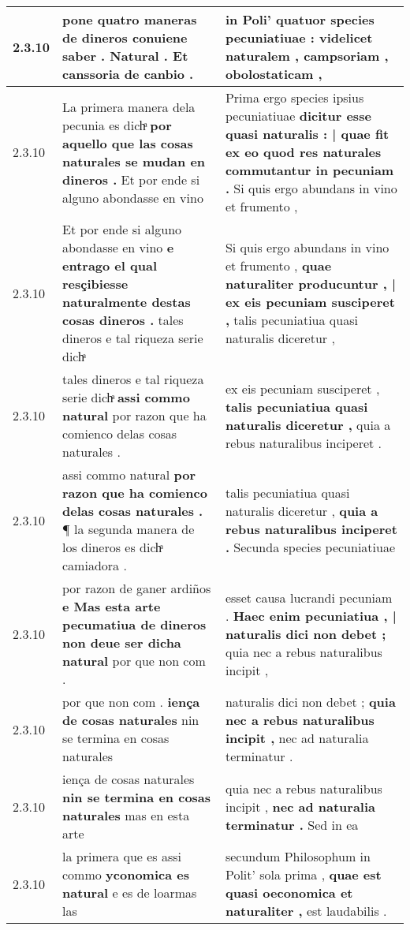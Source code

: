 \begin{tabular}{|p{1cm}|p{6.5cm}|p{6.5cm}|}
2.3.10 & pone quatro maneras de dineros conuiene saber . \textbf{ Natural . } Et canssoria de canbio . & in Poli’ \textbf{ quatuor species pecuniatiuae : } videlicet naturalem , campsoriam , obolostaticam , \\\hline
2.3.10 & La primera manera dela pecunia es dichͣ \textbf{ por aquello que las cosas naturales se mudan en dineros . } Et por ende si alguno abondasse en vino & Prima ergo species ipsius pecuniatiuae \textbf{ dicitur esse quasi naturalis : | quae fit ex eo quod res naturales commutantur in pecuniam . } Si quis ergo abundans in vino et frumento , \\\hline
2.3.10 & Et por ende si alguno abondasse en vino \textbf{ e entrago el qual resçibiesse naturalmente destas cosas dineros . } tales dineros e tal riqueza serie dichͣ & Si quis ergo abundans in vino et frumento , \textbf{ quae naturaliter producuntur , | ex eis pecuniam susciperet , } talis pecuniatiua quasi naturalis diceretur , \\\hline
2.3.10 & tales dineros e tal riqueza serie dichͣ \textbf{ assi commo natural } por razon que ha comienco delas cosas naturales . & ex eis pecuniam susciperet , \textbf{ talis pecuniatiua quasi naturalis diceretur , } quia a rebus naturalibus inciperet . \\\hline
2.3.10 & assi commo natural \textbf{ por razon que ha comienco delas cosas naturales . } ¶ la segunda manera de los dineros es dichͣ camiadora . & talis pecuniatiua quasi naturalis diceretur , \textbf{ quia a rebus naturalibus inciperet . } Secunda species pecuniatiuae \\\hline
2.3.10 & por razon de ganer ardiños \textbf{ e Mas esta arte pecumatiua de dineros non deue ser dicha natural } por que non com . & esset causa lucrandi pecuniam . \textbf{ Haec enim pecuniatiua , | naturalis dici non debet ; } quia nec a rebus naturalibus incipit , \\\hline
2.3.10 & por que non com . \textbf{ iença de cosas naturales } nin se termina en cosas naturales & naturalis dici non debet ; \textbf{ quia nec a rebus naturalibus incipit , } nec ad naturalia terminatur . \\\hline
2.3.10 & iença de cosas naturales \textbf{ nin se termina en cosas naturales } mas en esta arte & quia nec a rebus naturalibus incipit , \textbf{ nec ad naturalia terminatur . } Sed in ea \\\hline
2.3.10 & la primera que es assi commo \textbf{ yconomica es natural } e es de loarmas las & secundum Philosophum in Polit’ sola prima , \textbf{ quae est quasi oeconomica et naturaliter , } est laudabilis . \\\hline

\end{tabular}
